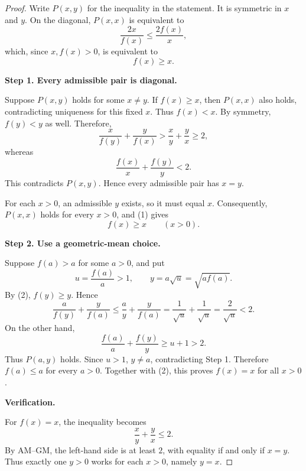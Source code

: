
\begin{dlsummary}[title={\bfseries Solution 18. The Geometric-Mean Trap},breakable]

\begin{proof}
Write $P(x,y)$ for the inequality in the statement. It is symmetric
in $x$ and $y$. On the diagonal, $P(x,x)$ is equivalent to
\[
\frac{2x}{f(x)}\leq\frac{2f(x)}x,
\]
which, since $x,f(x)>0$, is equivalent to
\[
f(x)\geq x. \tag{1}
\]

\medskip
\noindent
\textbf{Step 1. Every admissible pair is diagonal.}

Suppose $P(x,y)$ holds for some $x\ne y$. If $f(x)\geq x$, then
$P(x,x)$ also holds, contradicting uniqueness for this fixed $x$.
Thus $f(x)<x$. By symmetry, $f(y)<y$ as well. Therefore,
\[
\frac{x}{f(y)}+\frac{y}{f(x)}
>\frac xy+\frac yx\geq2,
\]
whereas
\[
\frac{f(x)}x+\frac{f(y)}y<2.
\]
This contradicts $P(x,y)$. Hence every admissible pair has $x=y$.

For each $x>0$, an admissible $y$ exists, so it must equal $x$.
Consequently, $P(x,x)$ holds for every $x>0$, and (1) gives
\[
f(x)\geq x\qquad(x>0). \tag{2}
\]

\medskip
\noindent
\textbf{Step 2. Use a geometric-mean choice.}

Suppose $f(a)>a$ for some $a>0$, and put
\[
u=\frac{f(a)}a>1,
\qquad y=a\sqrt u=\sqrt{a f(a)}.
\]
By (2), $f(y)\geq y$. Hence
\[
\frac{a}{f(y)}+\frac{y}{f(a)}
\leq\frac ay+\frac{y}{f(a)}
=\frac1{\sqrt u}+\frac1{\sqrt u}
=\frac2{\sqrt u}<2.
\]
On the other hand,
\[
\frac{f(a)}a+\frac{f(y)}y\geq u+1>2.
\]
Thus $P(a,y)$ holds. Since $u>1$, $y\ne a$, contradicting Step 1.
Therefore $f(a)\leq a$ for every $a>0$. Together with (2), this
proves $f(x)=x$ for all $x>0$.

\medskip
\noindent
\textbf{Verification.}

For $f(x)=x$, the inequality becomes
\[
\frac xy+\frac yx\leq2.
\]
By AM--GM, the left-hand side is at least $2$, with equality if and
only if $x=y$. Thus exactly one $y>0$ works for each $x>0$, namely
$y=x$.
\end{proof}

\end{dlsummary}